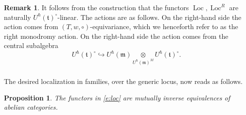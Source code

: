 \documentclass{amsart}
\newtheorem{Prop}[Thm]{Proposition}
\theoremstyle{definition}
\newtheorem{Rem}[Thm]{Remark}
\newcommand{\fm}{\mathfrak{m}}
\newcommand{\sss}{\subsubsection{}}
\newcommand{\ft}{\mathfrak{t}}
\numberwithin{equation}{section}
\begin{document}
\begin{Rem}\label{Rem:Loc_linearity}
It follows from the construction that the functors $\operatorname{Loc},\operatorname{Loc}^R$ are naturally $U^\hbar(\ft)^\circ$-linear. The actions are as follows.  On the right-hand side the action comes from $(T,w, \circ)$-equivariance, which we henceforth refer to as the right monodromy action. On the right-hand side the action comes from the central subalgebra
$$U^\hbar(\ft)^\circ \hookrightarrow  U^\hbar(\fm) \underset{U^\hbar(\fm)^M} \otimes U^\hbar(\ft)^\circ.$$
\end{Rem}

 \fi 
\sss The desired localization in families, over the generic locus, now reads as follows. 

\begin{Prop} \label{t:loc} The functors in \eqref{e:loc} are mutually inverse equivalences of abelian categories. 
\end{Prop}
\end{document}
